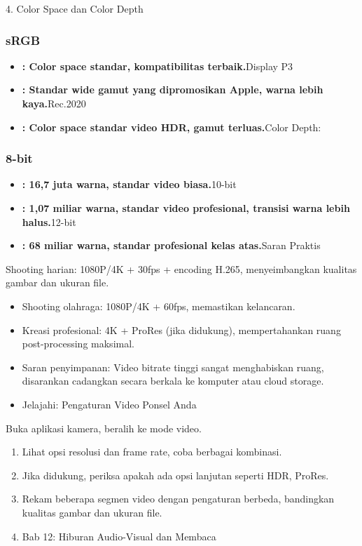 4. Color Space dan Color Depth


\subsubsection*{sRGB}

\begin{itemize}
  \item \textbf{: Color space standar, kompatibilitas terbaik.}Display P3
  \item \textbf{: Standar wide gamut yang dipromosikan Apple, warna lebih kaya.}Rec.2020
  \item \textbf{: Color space standar video HDR, gamut terluas.}Color Depth:
\end{itemize}

\subsubsection*{8-bit}

\begin{itemize}
  \item \textbf{: 16,7 juta warna, standar video biasa.}10-bit
  \item \textbf{: 1,07 miliar warna, standar video profesional, transisi warna lebih halus.}12-bit
  \item \textbf{: 68 miliar warna, standar profesional kelas atas.}Saran Praktis
\end{itemize}

\begin{tcbinfo}{Shooting harian: 1080P/4K + 30fps + encoding H.265, menyeimbangkan kualitas gambar dan ukuran file.}
\begin{itemize}
  \item Shooting olahraga: 1080P/4K + 60fps, memastikan kelancaran.
  \item Kreasi profesional: 4K + ProRes (jika didukung), mempertahankan ruang post-processing maksimal.
  \item Saran penyimpanan: Video bitrate tinggi sangat menghabiskan ruang, disarankan cadangkan secara berkala ke komputer atau cloud storage.
  \item Jelajahi: Pengaturan Video Ponsel Anda
\end{itemize}

\end{tcbinfo}

\begin{tcbpractice}{Buka aplikasi kamera, beralih ke mode video.}
\begin{enumerate}
  \item Lihat opsi resolusi dan frame rate, coba berbagai kombinasi.
  \item Jika didukung, periksa apakah ada opsi lanjutan seperti HDR, ProRes.
  \item Rekam beberapa segmen video dengan pengaturan berbeda, bandingkan kualitas gambar dan ukuran file.
  \item Bab 12: Hiburan Audio-Visual dan Membaca
\end{enumerate}

\end{tcbpractice}

